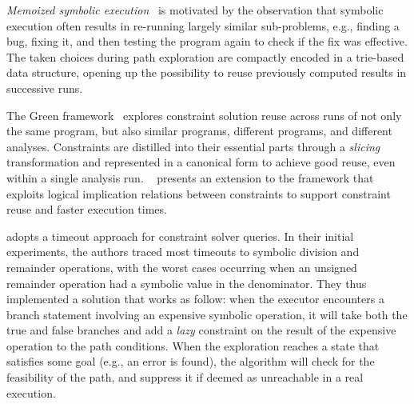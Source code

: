 {\em Memoized symbolic execution}~\cite{MEMO-ISSTA12} is motivated by the observation that symbolic execution often results in re-running largely similar sub-problems, e.g., finding a bug, fixing it, and then testing the program again to check if the fix was effective. The taken choices during path exploration are compactly encoded in a trie-based data structure, opening up the possibility to reuse previously computed results in successive runs.

The Green framework~\cite{GREEN-FSE12} explores constraint solution reuse across runs of not only the same program, but also similar programs, different programs, and different analyses. Constraints are distilled into their essential parts through a {\em slicing} transformation and represented in a canonical form to achieve good reuse, even within a single analysis run. ~\cite{JGY-ISSTA15} presents an extension to the framework that exploits logical implication relations between constraints to support constraint reuse and faster execution times.



\cite{UCKLEE-USEC15} adopts a timeout approach for constraint solver queries. In their initial experiments, the authors traced most timeouts to symbolic division and remainder operations, with the worst cases occurring when an unsigned remainder operation had a symbolic value in the denominator.
They thus implemented a solution that works as follow: when the executor encounters a branch statement involving an expensive symbolic operation, it will take both the true and false branches and add a {\em lazy} constraint on the result of the expensive operation to the path conditions. When the exploration reaches a state that satisfies some goal (e.g., an error is found), the algorithm will check for the feasibility of the path, and suppress it if deemed as unreachable in a real execution.

